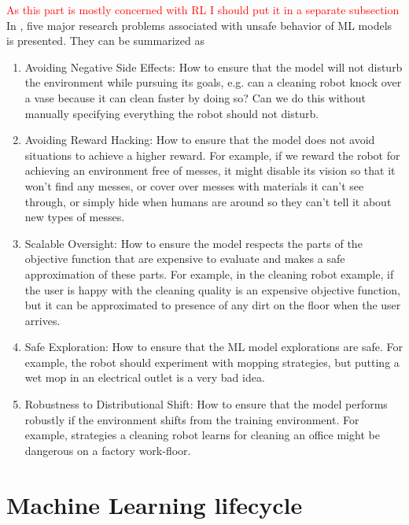 % 
\textcolor{red}{As this part is mostly concerned with RL I should put it in a separate subsection}
In \cite{Amodei2016}, five major research problems associated with unsafe behavior of ML models is presented. They can be summarized as
\begin{enumerate}
	\item Avoiding Negative Side Effects: How to ensure that the model will not disturb the environment while pursuing its goals, e.g. can a cleaning robot knock over a vase because it can clean faster by doing so? Can we do this without manually specifying everything the robot should not disturb.
	
	\item Avoiding Reward Hacking: How to ensure that the model does not avoid situations to achieve a higher reward. For example, if we reward the robot for achieving an environment free of messes, it might disable its vision so that it won’t find any messes, or cover over messes with materials it can’t see through, or simply hide when humans are around so they can’t tell it about new types of messes.
	
	\item Scalable Oversight: How to ensure the model respects the parts of the objective function that are expensive to evaluate and makes a safe approximation of these parts. 
	For example, in the cleaning robot example, if the user is happy with the cleaning quality is an expensive objective function, but it can be approximated to presence of any dirt on the floor when the user arrives.
	
	\item Safe Exploration: How to ensure that the ML model explorations are safe. For example, the robot should experiment with mopping strategies, but putting a wet mop in an electrical outlet is a very bad idea.
	
	\item Robustness to Distributional Shift: How to ensure that the model performs robustly if the environment shifts from the training environment. For example, strategies a cleaning robot learns for cleaning an office might be dangerous on a factory work-floor.

\end{enumerate}

\section{Machine Learning lifecycle}

